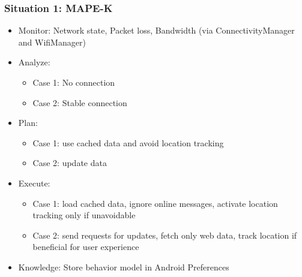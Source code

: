 \documentclass[aspectratio=169]{beamer}
\begin{document}
\begin{frame}   
	\frametitle{Situation 1: MAPE-K}
	\begin{itemize}
		\item Monitor: Network state, Packet loss, Bandwidth (via ConnectivityManager and WifiManager)
		\item Analyze: 
			 \begin{itemize} 
				\item Case 1: No connection
				\item Case 2: Stable connection
			\end{itemize}
		\item Plan:
			\begin{itemize}
				\item Case 1: use cached data and avoid location tracking
				\item Case 2:  update data
			\end{itemize}
		\item Execute:
			\begin{itemize}
				\item Case 1: load cached data, ignore online messages, activate location tracking only if unavoidable
    				\item Case 2: send requests for updates, fetch only web data, track location if beneficial for user experience 
			\end{itemize}
		\item Knowledge: Store behavior model in Android Preferences
	\end{itemize}
\end{frame}
\end{document}
